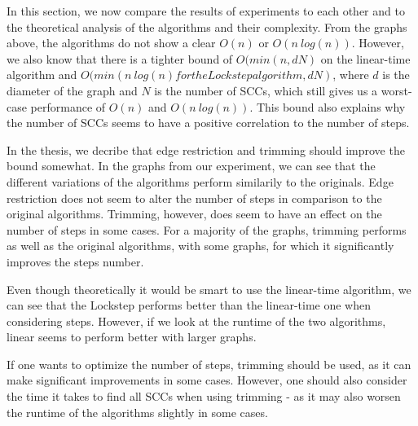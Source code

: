 \documentclass[../master/master.tex]{subfiles}
\begin{document}
In this section, we now compare the results of experiments to each other and to the theoretical analysis of the algorithms and their complexity.
From the graphs above, the algorithms do not show a clear $O(n)$ or $O(n\ log(n))$. However, we also know that there is a tighter bound of $O(min(n, dN)$ on the linear-time algorithm and $O(min(n\ log(n) for the Lockstep algorithm, dN)$, where $d$ is the diameter of the graph and $N$ is the number of SCCs, which still gives us a worst-case performance of $O(n)$ and $O(n\ log(n))$.  This bound also explains why the number of SCCs seems to have a positive correlation to the number of steps.

In the thesis, we decribe that edge restriction and trimming should improve the bound somewhat. In the graphs from our experiment, we can see that the different variations of the algorithms perform similarily to the originals. Edge restriction does not seem to alter the number of steps in comparison to the original algorithms. Trimming, however, does seem to have an effect on the number of steps in some cases. For a majority of the graphs, trimming performs as well as the original algorithms, with some graphs, for which it significantly improves the steps number.

Even though theoretically it would be smart to use the linear-time algorithm, we can see that the Lockstep performs better than the linear-time one when considering steps. However, if we look at the runtime of the two algorithms, linear seems to perform better with larger graphs.

If one wants to optimize the number of steps, trimming should be used, as it can make significant improvements in some cases. However, one should also consider the time it takes to find all SCCs when using trimming - as it may also worsen the runtime of the algorithms slightly in some cases.
\end{document}

